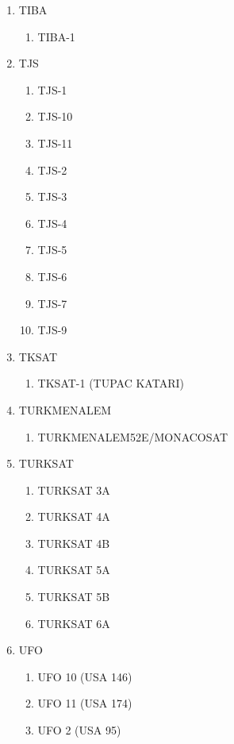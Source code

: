 \begin{multicols}{2}
\begin{enumerate}
  \begin{enumerate}
    \item TIANTONG-1 1
    \item TIANTONG-1 2
    \item TIANTONG-1 3
  \end{enumerate}
  \item TIBA
  \begin{enumerate}
    \item TIBA-1
  \end{enumerate}
  \item TJS
  \begin{enumerate}
    \item TJS-1
    \item TJS-10
    \item TJS-11
    \item TJS-2
    \item TJS-3
    \item TJS-4
    \item TJS-5
    \item TJS-6
    \item TJS-7
    \item TJS-9
  \end{enumerate}
  \item TKSAT
  \begin{enumerate}
    \item TKSAT-1 (TUPAC KATARI)
  \end{enumerate}
  \item TURKMENALEM
  \begin{enumerate}
    \item TURKMENALEM52E/MONACOSAT
  \end{enumerate}
  \item TURKSAT
  \begin{enumerate}
    \item TURKSAT 3A
    \item TURKSAT 4A
    \item TURKSAT 4B
    \item TURKSAT 5A
    \item TURKSAT 5B
    \item TURKSAT 6A
  \end{enumerate}
  \item UFO
  \begin{enumerate}
    \item UFO 10 (USA 146)
    \item UFO 11 (USA 174)
    \item UFO 2 (USA 95)

\end{enumerate}
\end{enumerate}
\end{multicols}
